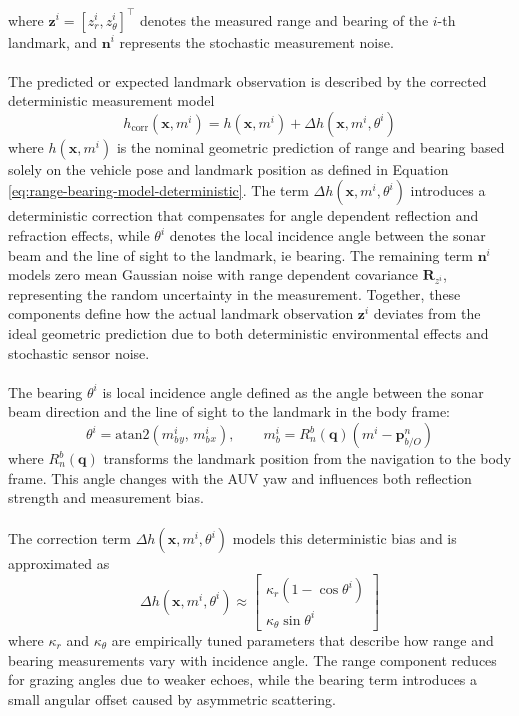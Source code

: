 where $\mathbf{z}^i = [z_r^i, z_\theta^i]^\top$ denotes the measured range and bearing of the $i$-th landmark, and $\mathbf{n}^i$ represents the stochastic measurement noise.  
\\ \\
The predicted or expected landmark observation is described by the corrected deterministic measurement model
\begin{equation}
    h_{\text{corr}}(\mathbf{x}, m^i) = h(\mathbf{x}, m^i) + \Delta h(\mathbf{x}, m^i, \theta^i)
    \label{eq:range-bearing-model-extended}
\end{equation}
where $h(\mathbf{x}, m^i)$ is the nominal geometric prediction of range and bearing based solely on the vehicle pose and landmark position as defined in Equation \eqref{eq:range-bearing-model-deterministic}. The term $\Delta h(\mathbf{x}, m^i, \theta^i)$ introduces a deterministic correction that compensates for angle dependent reflection and refraction effects, while $\theta^i$ denotes the local incidence angle between the sonar beam and the line of sight to the landmark, ie bearing. The remaining term $\mathbf{n}^i$ models zero mean Gaussian noise with range dependent covariance $\mathbf{R}_{z^i}$, representing the random uncertainty in the measurement. Together, these components define how the actual landmark observation $\mathbf{z}^i$ deviates from the ideal geometric prediction due to both deterministic environmental effects and stochastic sensor noise.
\\ \\
The bearing $\theta^i$ is local incidence angle defined as the angle between the sonar beam direction and the line of sight to the landmark in the body frame:
$$
    \theta^i = \mathrm{atan2}(m_b^i{}_y,\, m_b^i{}_x),
    \qquad
    m_b^i = R_n^b(\mathbf{q}) \left( m^i - \mathbf{p}_{b/O}^{n} \right)
$$
where $R_n^b(\mathbf{q})$ transforms the landmark position from the navigation to the body frame. This angle changes with the AUV yaw and influences both reflection strength and measurement bias.  
\\ \\
The correction term $\Delta h(\mathbf{x}, m^i, \theta^i)$ models this deterministic bias and is approximated as
$$
    \Delta h(\mathbf{x}, m^i, \theta^i) \approx
    \begin{bmatrix}
        \kappa_r (1 - \cos{\theta^i}) \\
        \kappa_\theta \sin{\theta^i}
    \end{bmatrix}
$$
where $\kappa_r$ and $\kappa_\theta$ are empirically tuned parameters that describe how range and bearing measurements vary with incidence angle. The range component reduces for grazing angles due to weaker echoes, while the bearing term introduces a small angular offset caused by asymmetric scattering.  
